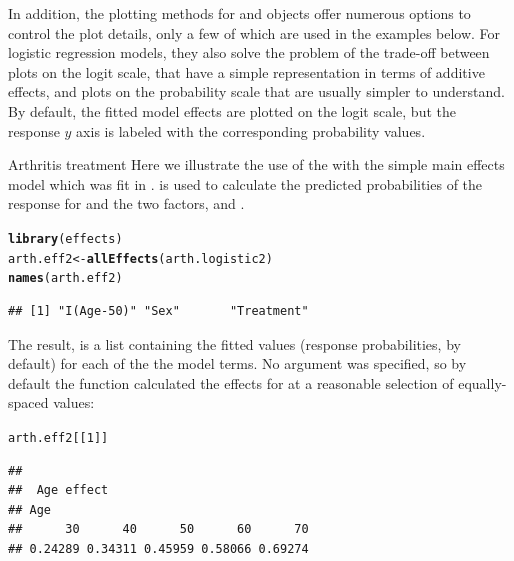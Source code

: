 \documentclass[11pt]{book}\usepackage[]{graphicx}\usepackage[]{color}
\makeatletter
\newcommand{\hlnum}[1]{\textcolor[rgb]{0.686,0.059,0.569}{#1}}%
\newcommand{\hlstd}[1]{\textcolor[rgb]{0.345,0.345,0.345}{#1}}%
\newcommand{\hlkwb}[1]{\textcolor[rgb]{0.69,0.353,0.396}{#1}}%
\newcommand{\hlkwd}[1]{\textcolor[rgb]{0.737,0.353,0.396}{\textbf{#1}}}%
\newenvironment{kframe}{%
 \def\at@end@of@kframe{}%
 \ifinner\ifhmode%
  \def\at@end@of@kframe{\end{minipage}}%
  \begin{minipage}{\columnwidth}%
 \fi\fi%
 \def\FrameCommand##1{\hskip\@totalleftmargin \hskip-\fboxsep
 \colorbox{shadecolor}{##1}\hskip-\fboxsep
     \hskip-\linewidth \hskip-\@totalleftmargin \hskip\columnwidth}%
 \MakeFramed {\advance\hsize-\width
   \@totalleftmargin\z@ \linewidth\hsize
   \@setminipage}}%
 {\par\unskip\endMakeFramed%
 \at@end@of@kframe}
\newenvironment{knitrout}{}{} %
\renewenvironment{knitrout}{\small\renewcommand{\baselinestretch}{.85}}{} %
\makeatother
\begin{document}
In addition, the plotting methods for  and  objects offer
numerous options to control the plot details, only a few of which are used in the
examples below. For logistic regression models, they also solve the problem of
the trade-off between plots on the logit scale, that have a simple representation
in terms of additive effects, and plots on the probability scale that are
usually simpler to understand.  By default, the fitted model effects are 
plotted on the logit scale, but the response $y$ axis is labeled with 
the corresponding probability values.

\begin{Example}{Arthritis treatment}
Here we illustrate the use of the  with the simple main effects
model which was fit in .   is used to 
calculate the predicted probabilities of the  response for
 and the two factors,  and . 
\begin{knitrout}
\color{fgcolor}\begin{kframe}
\begin{alltt}
\hlkwd{library}\hlstd{(effects)}
\hlstd{arth.eff2} \hlkwb{<-} \hlkwd{allEffects}\hlstd{(arth.logistic2)}
\hlkwd{names}\hlstd{(arth.eff2)}
\end{alltt}
\begin{verbatim}
## [1] "I(Age-50)" "Sex"       "Treatment"
\end{verbatim}
\end{kframe}
\end{knitrout}
The result,  is a list containing the fitted values (response probabilities, by default)
for each of the the model terms. No  argument was specified, so by default
the function calculated the effects for  at a reasonable selection of equally-spaced
values:
\begin{knitrout}
\color{fgcolor}\begin{kframe}
\begin{alltt}
\hlstd{arth.eff2[[}\hlnum{1}\hlstd{]]}
\end{alltt}
\begin{verbatim}
## 
##  Age effect
## Age
##      30      40      50      60      70 
## 0.24289 0.34311 0.45959 0.58066 0.69274
\end{verbatim}
\end{kframe}
\end{knitrout}

\end{Example}
\end{document}
